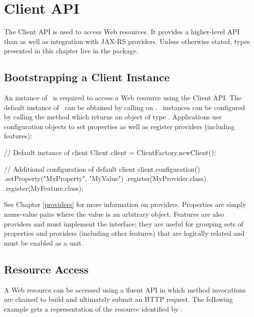 \chapter{Client API}
\label{client_api}

The Client API is used to access Web resources. It provides a higher-level API than  as well as integration with JAX-RS providers. Unless otherwise stated, types presented in this chapter live in the  package.

\section{Bootstrapping a Client Instance}

An instance of \Client\ is required to access a Web resource using the Client API. The default instance of \Client\ can be obtained by calling  on \ClientFactory. \Client\ instances can be configured by calling the  method which returns an object
of type . Applications use configuration objects to set properties as well as register providers (including features):

\begin{listing}{1}
// Default instance of client
Client client = ClientFactory.newClient();

// Additional configuration of default client
client.configuration()
    .setProperty("MyProperty", "MyValue")
    .register(MyProvider.class)
    .register(MyFeature.class);
\end{listing}

See Chapter \ref{providers} for more information on providers. Properties are simply name-value pairs where the value is an arbitrary object.  Features are also providers and must implement the  interface; they are useful for grouping sets of properties and providers (including other features) that are logically related and must be enabled as a unit.

\section{Resource Access}
\label{resource_access}

A Web resource can be accessed using a fluent API in which method	 invocations are chained to build and ultimately submit an HTTP request. The following example gets a  representation of the resource identified by :

